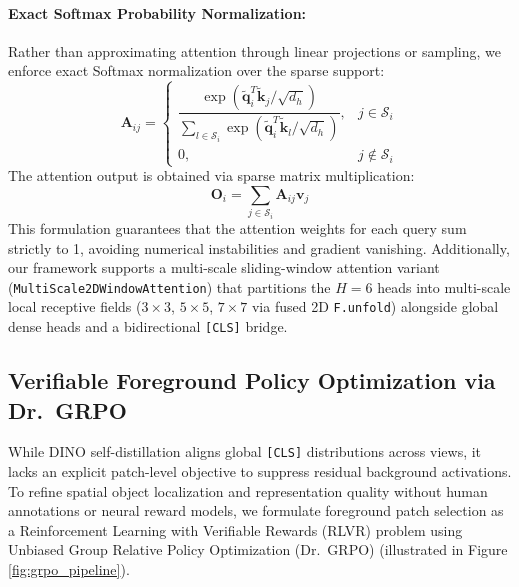 \documentclass[11pt,a4paper]{article}
\begin{document}
\paragraph{Exact Softmax Probability Normalization:} Rather than approximating attention through linear projections or sampling, we enforce exact Softmax normalization over the sparse support:
\begin{equation}
\mathbf{A}_{ij} = \begin{cases}
\dfrac{\exp\left(\tilde{\mathbf{q}}_i^T \tilde{\mathbf{k}}_j / \sqrt{d_h}\right)}{\sum_{l \in \mathcal{S}_i} \exp\left(\tilde{\mathbf{q}}_i^T \tilde{\mathbf{k}}_l / \sqrt{d_h}\right)}, & j \in \mathcal{S}_i \\
0, & j \notin \mathcal{S}_i
\end{cases}
\label{eq:sparse_softmax}
\end{equation}
The attention output is obtained via sparse matrix multiplication:
\begin{equation}
\mathbf{O}_i = \sum_{j \in \mathcal{S}_i} \mathbf{A}_{ij} \mathbf{v}_j
\label{eq:attention_output}
\end{equation}
This formulation guarantees that the attention weights for each query sum strictly to 1, avoiding numerical instabilities and gradient vanishing. Additionally, our framework supports a multi-scale sliding-window attention variant (\texttt{MultiScale2DWindowAttention}) that partitions the $H=6$ heads into multi-scale local receptive fields ($3\times 3$, $5\times 5$, $7\times 7$ via fused 2D \texttt{F.unfold}) alongside global dense heads and a bidirectional \texttt{[CLS]} bridge.

\subsection{Verifiable Foreground Policy Optimization via Dr.\ GRPO}
\label{subsec:grpo_method}

While DINO self-distillation aligns global \texttt{[CLS]} distributions across views, it lacks an explicit patch-level objective to suppress residual background activations. To refine spatial object localization and representation quality without human annotations or neural reward models, we formulate foreground patch selection as a Reinforcement Learning with Verifiable Rewards (RLVR) problem using Unbiased Group Relative Policy Optimization (Dr.\ GRPO) \cite{shao2024deepseekmath, liu2025drgrpo} (illustrated in Figure \ref{fig:grpo_pipeline}).
\end{document}
